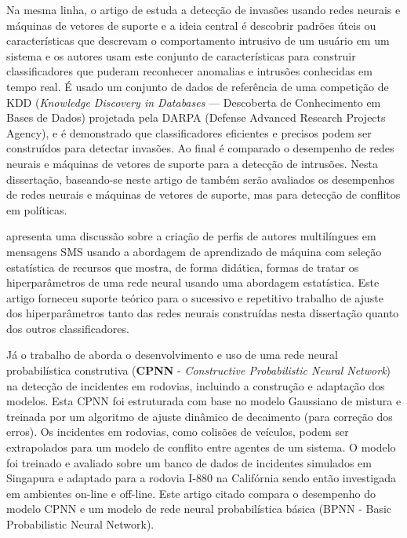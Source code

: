 Na mesma linha, o artigo de \cite{mukkamala_intrusion_2002} estuda a detecção de invasões usando redes neurais e máquinas de vetores de suporte e a ideia central é descobrir padrões úteis ou características que descrevam o comportamento intrusivo de um usuário em um sistema e os autores usam este conjunto de características para construir classificadores que puderam reconhecer anomalias e intrusões conhecidas em tempo real. É usado um conjunto de dados de referência de uma competição de KDD (\textit{Knowledge Discovery in Databases} --- Descoberta de Conhecimento em Bases de Dados) projetada pela DARPA (Defense Advanced Research Projects Agency), e é demonstrado que classificadores eficientes e precisos podem ser construídos para detectar invasões. Ao final é comparado o desempenho de redes neurais e máquinas de vetores de suporte para a detecção de intrusões. Nesta dissertação, baseando-se neste artigo de \cite{mukkamala_intrusion_2002} também serão avaliados os desempenhos de redes neurais e máquinas de vetores de suporte, mas para detecção de conflitos em políticas.

\cite{thenmozhi_multi-lingual_2018} apresenta uma discussão sobre a criação de perfis de autores multilíngues em mensagens SMS usando a abordagem de aprendizado de máquina com seleção estatística de recursos que mostra, de forma didática, formas de tratar os hiperparâmetros de uma rede neural usando uma abordagem estatística. Este artigo forneceu suporte teórico para o sucessivo e repetitivo trabalho de ajuste dos hiperparâmetros tanto das redes neurais construídas nesta dissertação quanto dos outros classificadores.

Já o trabalho de \cite{jin_development_2002} aborda o desenvolvimento e uso de uma rede neural probabilística construtiva (\textbf{CPNN} - \textit{Constructive Probabilistic Neural Network}) na detecção de incidentes em rodovias, incluindo a construção e adaptação dos modelos. Esta CPNN foi estruturada com base no modelo Gaussiano de mistura e treinada por um algoritmo de ajuste dinâmico de decaimento (para correção dos erros). Os incidentes em rodovias, como colisões de veículos, podem ser extrapolados para um modelo de conflito entre agentes de um sistema. O modelo foi treinado e avaliado sobre um banco de dados de incidentes simulados em Singapura e adaptado para a rodovia I-880 na Califórnia sendo então investigada em ambientes on-line e off-line. Este artigo citado compara o desempenho do modelo CPNN e um modelo de rede neural probabilística básica (BPNN - Basic Probabilistic Neural Network).

